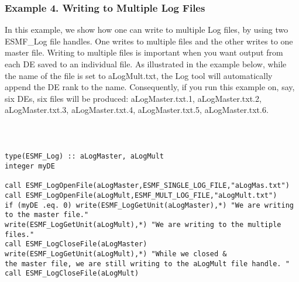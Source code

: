 \subsubsection{Example 4. Writing to Multiple Log Files }

In this example, we show how one can write to multiple Log files,
by using two ESMF\_Log file handles.  One writes to multiple files and the
other writes to one master file. Writing to multiple files is important 
when you want output from each DE saved to an individual file. 
As illustrated in the example below, while the name of the file is set to
aLogMult.txt, the Log tool will automatically append the DE rank to
the name. Consequently, if you run this example on, say, six
DEs, six files will be produced: aLogMaster.txt.1, aLogMaster.txt.2,
aLogMaster.txt.3, aLogMaster.txt.4, aLogMaster.txt.5, aLogMaster.txt.6.

{\tt
\begin{verbatim}

type(ESMF_Log) :: aLogMaster, aLogMult
integer myDE

call ESMF_LogOpenFile(aLogMaster,ESMF_SINGLE_LOG_FILE,"aLogMas.txt")
call ESMF_LogOpenFile(aLogMult,ESMF_MULT_LOG_FILE,"aLogMult.txt")
if (myDE .eq. 0) write(ESMF_LogGetUnit(aLogMaster),*) "We are writing to the master file."
write(ESMF_LogGetUnit(aLogMult),*) "We are writing to the multiple files."
call ESMF_LogCloseFile(aLogMaster)
write(ESMF_LogGetUnit(aLogMult),*) "While we closed &
the master file, we are still writing to the aLogMult file handle. "
call ESMF_LogCloseFile(aLogMult)

\end{verbatim}
\tt}





